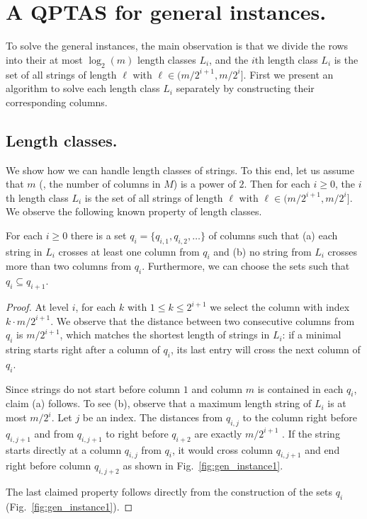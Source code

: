 \section{A QPTAS for general instances.}\label{sec:QPTAS}

To solve the general instances, the main observation is that we divide the rows into their at most $\log_2(m)$ length classes $L_i$, and the $i$th length class $L_i$ is the set of all strings of length $\ell$ with $\ell \in (m/2^{i+1}, m/2^{i}]$.
First we present an algorithm to solve each length class $L_i$ separately by constructing their corresponding columns.

\subsection{Length classes.}\label{sec:length-classes}
We show how we can handle length classes of strings.
To this end, let us assume \WLOG that $m$ (\ie, the number of columns in $M$) is a power of $2$.
Then for each $i \ge 0$, the $i$th length class $L_i$ is the set of all strings of length $\ell$ with $\ell \in (m/2^{i+1}, m/2^{i}]$. 
We observe the following known property of length classes.
\begin{lemma}\label{lem:half}
    For each $i \ge 0$ there is a set $q_i = \{q_{i,1},q_{i,2},\dotsc\}$ of columns such that (a) each string in $L_i$ crosses at least one column from $q_i$ and (b) no string from $L_i$ crosses more than two columns from $q_i$.
    Furthermore, we can choose the sets such that $q_i \subseteq q_{i+1}$.
\end{lemma}
\begin{proof}
    At level $i$, for each $k$ with $1 \le k \le 2^{i+1}$ we select the column with index $k \cdot m/2^{i+1}$.
    We observe that the distance between two consecutive columns from $q_i$ is $m/2^{i+1}$, which matches the shortest length of strings in $L_i$: 
    if a minimal string starts right after a column of $q_i$, its last entry will cross the next column of $q_i$. 

    Since strings do not start before column $1$ and column $m$ is contained in each $q_i$, claim (a) follows.
    To see (b), observe that a maximum length string of $L_i$ is at most $m/2^i$.
    Let $j$ be an index. 
    The distances from $q_{i,j}$ to the column right before $q_{i,j+1}$ and from $q_{i,j+1}$ to right before $q_{i+2}$ are exactly $m/2^{i+1}$ .
    If the string starts directly at a column $q_{i,j}$ from $q_i$, it would cross column $q_{i,j+1}$ and end right before column $q_{i,j+2}$ as shown in Fig.~\ref{fig:gen_instance1}.

    The last claimed property follows directly from the construction of the sets $q_i$ (Fig.~\ref{fig:gen_instance1}).
\end{proof}

